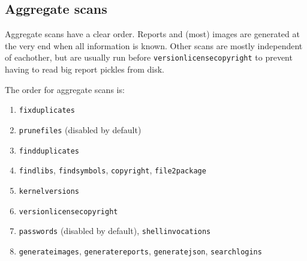 \documentclass[10pt,a4paper]{article}
\begin{document}
\subsection{Aggregate scans}

Aggregate scans have a clear order. Reports and (most) images are generated at
the very end when all information is known. Other scans are mostly independent
of eachother, but are usually run before \texttt{versionlicensecopyright} to
prevent having to read big report pickles from disk.

The order for aggregate scans is:

\begin{enumerate}
\item \texttt{fixduplicates}
\item \texttt{prunefiles} (disabled by default)
\item \texttt{findduplicates}
\item \texttt{findlibs}, \texttt{findsymbols}, \texttt{copyright}, \texttt{file2package}
\item \texttt{kernelversions}
\item \texttt{versionlicensecopyright}
\item \texttt{passwords} (disabled by default), \texttt{shellinvocations}
\item \texttt{generateimages}, \texttt{generatereports}, \texttt{generatejson}, \texttt{searchlogins}
\end{enumerate}
\end{document}
